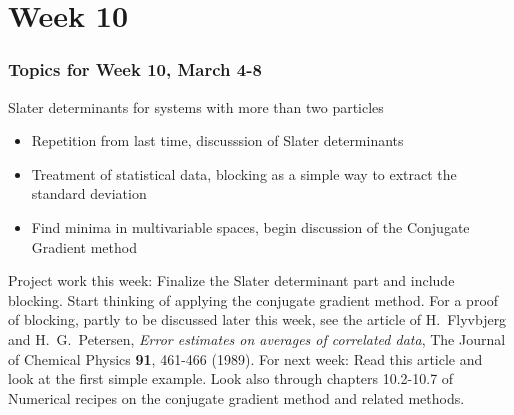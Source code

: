 \section[Week 10]{Week 10}
\frame
{
  \frametitle{Topics for Week 10, March 4-8}
  \begin{block}{Slater determinants for systems with more than two particles}
\begin{itemize}
\item Repetition from last time, discusssion of Slater determinants
\item Treatment of statistical data, blocking as a simple way to extract the standard deviation
\item Find minima in multivariable spaces, begin discussion of the Conjugate Gradient method
\end{itemize}
Project work this week: Finalize the Slater determinant part and include blocking. Start thinking of applying the conjugate gradient method. For a proof of blocking, partly to be discussed later this week, see the article of 
H.~Flyvbjerg and H.~G.~Petersen, {\em Error estimates on averages of correlated data},  The Journal of Chemical Physics {\bf 91}, 461-466 (1989).
For next week: Read this article and look at the first simple example. Look  also through chapters 10.2-10.7 of Numerical recipes on the conjugate gradient method and related methods.
  \end{block}
} 




